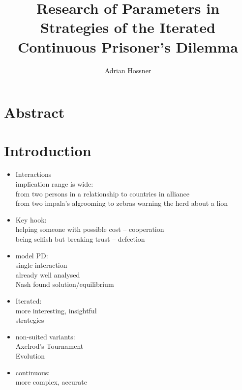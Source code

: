 \documentclass{article}
\title{Research of Parameters in Strategies of the Iterated Continuous Prisoner's Dilemma}
\author{Adrian Hossner}
\date{ } %
\begin{document}
\maketitle

\newpage
\tableofcontents
\newpage

\section*{Abstract}

\section{Introduction}

\begin{itemize}

	\item Interactions\\
		implication range is wide:\\
		from two persons in a relationship to countries in alliance\\
		from two impala's algrooming to zebras warning the herd about a lion \\

	\item Key hook:\\
		helping someone with possible cost -- cooperation\\
		being selfish but breaking trust -- defection\\

	\item model PD:\\
		single interaction\\
		already well analysed\\
		Nash found solution/equilibrium\\

	\item Iterated:\\
		more interesting, insightful\\
		strategies\\

	\item non-suited variants:\\
		Axelrod's Tournament\\
		Evolution\\

	\item continuous:\\
		more complex, accurate\\


\end{itemize}
\end{document}
